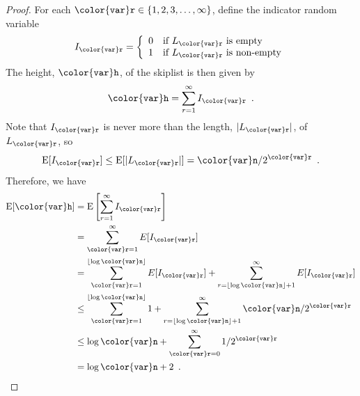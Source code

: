 \documentclass[10pt]{book}
\theoremstyle{plain}
\theoremstyle{definition}
\newcommand{\E}{\mathrm{E}}
\begin{document}
\begin{proof}
  For each $\ensuremath{\mathtt{{\color{var}r}}}\in\{1,2,3,\ldots,\infty\}$, 
  define the indicator random variable
  \[ I_{\ensuremath{\mathtt{{\color{var}r}}}} = \left\{\begin{array}{ll}
     0 & \mbox{if $L_{\ensuremath{\mathtt{{\color{var}r}}}}$ is empty} \\
     1 & \mbox{if $L_{\ensuremath{\mathtt{{\color{var}r}}}}$ is non-empty}
     \end{array}\right.
  \]
  The height, \ensuremath{\mathtt{{\color{var}h}}}, of the skiplist is then given by
  \[
       \ensuremath{\mathtt{{\color{var}h}}} = \sum_{r=1}^\infty I_{\ensuremath{\mathtt{{\color{var}r}}}} \enspace .
  \]
  Note that $I_{\ensuremath{\mathtt{{\color{var}r}}}}$ is never more than the length, $|L_{\ensuremath{\mathtt{{\color{var}r}}}}|$, of $L_{\ensuremath{\mathtt{{\color{var}r}}}}$, so 
  \[
     \E[I_{\ensuremath{\mathtt{{\color{var}r}}}}] \le \E[|L_{\ensuremath{\mathtt{{\color{var}r}}}}|] = \ensuremath{\mathtt{{\color{var}n}}}/2^{\ensuremath{\mathtt{{\color{var}r}}}} \enspace .
  \]
  Therefore, we have
  \begin{align*}
       \E[\ensuremath{\mathtt{{\color{var}h}}}] &= \E\left[\sum_{r=1}^\infty I_{\ensuremath{\mathtt{{\color{var}r}}}}\right] \\
        &= \sum_{\ensuremath{\mathtt{{\color{var}r}}}=1}^{\infty} E[I_{\ensuremath{\mathtt{{\color{var}r}}}}] \\
        &= \sum_{\ensuremath{\mathtt{{\color{var}r}}}=1}^{\lfloor\log \ensuremath{\mathtt{{\color{var}n}}}\rfloor} E[I_{\ensuremath{\mathtt{{\color{var}r}}}}]
                 + \sum_{r=\lfloor\log \ensuremath{\mathtt{{\color{var}n}}}\rfloor+1}^{\infty} E[I_{\ensuremath{\mathtt{{\color{var}r}}}}]  \\
        &\le \sum_{\ensuremath{\mathtt{{\color{var}r}}}=1}^{\lfloor\log \ensuremath{\mathtt{{\color{var}n}}}\rfloor} 1
                 + \sum_{r=\lfloor\log \ensuremath{\mathtt{{\color{var}n}}}\rfloor+1}^{\infty} \ensuremath{\mathtt{{\color{var}n}}}/2^{\ensuremath{\mathtt{{\color{var}r}}}} \\
        &\le \log \ensuremath{\mathtt{{\color{var}n}}}
                 + \sum_{\ensuremath{\mathtt{{\color{var}r}}}=0}^\infty 1/2^{\ensuremath{\mathtt{{\color{var}r}}}} \\
        &= \log \ensuremath{\mathtt{{\color{var}n}}} + 2 \enspace . \qedhere
  \end{align*}
\end{proof}
\end{document}
